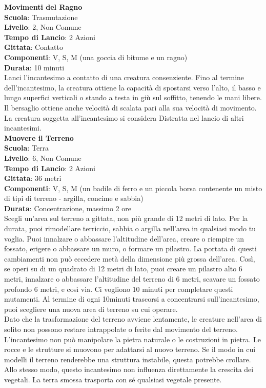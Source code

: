 \begin{multicols}{2}
\medskip\textbf{Movimenti del Ragno}\\
\textbf{Scuola}: Trasmutazione\\
\textbf{Livello}: 2, Non Comune\\
\textbf{Tempo di Lancio}: 2 Azioni\\
\textbf{Gittata}: Contatto\\
\textbf{Componenti}: V, S, M (una goccia di bitume e un ragno)\\
\textbf{Durata}: 10 minuti \\
Lanci l'incantesimo a contatto di una creatura consenziente. Fino al termine dell'incantesimo, la creatura ottiene la capacità di spostarsi verso l'alto, il basso e lungo superfici verticali o stando a testa in giù sul soffitto, tenendo le mani libere. Il bersaglio ottiene anche velocità di scalata pari alla sua velocità di movimento. La creatura soggetta all'incantesimo si considera Distratta nel lancio di altri incantesimi.\\

\medskip\textbf{Muovere il Terreno}\\
\textbf{Scuola}: Terra\\
\textbf{Livello}: 6, Non Comune\\
\textbf{Tempo di Lancio}: 2 Azioni\\
\textbf{Gittata}: 36 metri\\
\textbf{Componenti}: V, S, M (un badile di ferro e un piccola borsa contenente un misto di tipi di terreno - argilla, concime e sabbia)\\
\textbf{Durata}: Concentrazione, massimo 2 ore\\
Scegli un'area sul terreno a gittata, non più grande di 12 metri di lato. Per la durata, puoi rimodellare terriccio, sabbia o argilla nell'area in qualsiasi modo tu voglia. Puoi innalzare o abbassare l'altitudine dell'area, creare o riempire un fossato, erigere o abbassare un muro, o formare un pilastro. La portata di questi cambiamenti non può eccedere metà della dimensione più grossa dell'area. Così, se operi su di un quadrato di 12 metri di lato, puoi creare un pilastro alto 6 metri, innalzare o abbassare l'altitudine del terreno di 6 metri, scavare un fossato profondo 6 metri, e così via. Ci vogliono 10 minuti per completare questi mutamenti. Al termine di ogni 10minuti trascorsi a concentrarsi sull'incantesimo, puoi scegliere una nuova area di terreno su cui operare.\\
Dato che la trasformazione del terreno avviene lentamente, le creature nell'area di solito non possono restare intrappolate o ferite dal movimento del terreno. L'incantesimo non può manipolare la pietra naturale o le costruzioni in pietra. Le rocce e le strutture si muovono per adattarsi al nuovo terreno. Se il modo in cui modelli il terreno renderebbe una struttura instabile, questa potrebbe crollare. Allo stesso modo, questo incantesimo non influenza direttamente la crescita dei vegetali. La terra smossa trasporta con sé qualsiasi vegetale presente.


\end{multicols}
